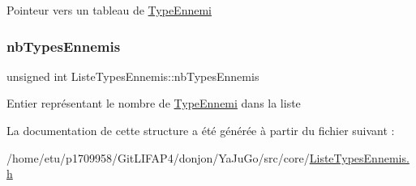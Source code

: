 Pointeur vers un tableau de \mbox{\hyperlink{structTypeEnnemi}{Type\+Ennemi}} \mbox{\label{structListeTypesEnnemis_ae489d7d7e8b16a9e7425729fa26b6cbb}} 
\subsubsection{\texorpdfstring{nb\+Types\+Ennemis}{nbTypesEnnemis}}
{\footnotesize\ttfamily unsigned int Liste\+Types\+Ennemis\+::nb\+Types\+Ennemis}

Entier représentant le nombre de \mbox{\hyperlink{structTypeEnnemi}{Type\+Ennemi}} dans la liste 

La documentation de cette structure a été générée à partir du fichier suivant \+:\begin{DoxyCompactItemize}
\item 
/home/etu/p1709958/\+Git\+L\+I\+F\+A\+P4/donjon/\+Ya\+Ju\+Go/src/core/\mbox{\hyperlink{ListeTypesEnnemis_8h}{Liste\+Types\+Ennemis.\+h}}\end{DoxyCompactItemize}
